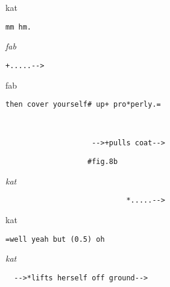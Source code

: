 \documentclass[output=paper,nonflat,modfont,draft]{langsci/langscibook}
\begin{document}

\begin{transbox}{6}{kat}
\begin{verbatim}
mm hm.
\end{verbatim}
\end{transbox}


\begin{transbox}{8}{\textit{fab}}
\begin{verbatim}
+.....-->
\end{verbatim}
\end{transbox}

\begin{mdframedkendrick}[style=firstfoc]
\begin{transbox}{9}{fab}
\begin{verbatim}
then cover yourself# up+ pro*perly.=
\end{verbatim}
\end{transbox}
\end{mdframedkendrick}\vspace{-5mm}

\begin{transbox}{10}{~}
\begin{verbatim}
                    -->+pulls coat-->
\end{verbatim}
\end{transbox}

\begin{transbox}{11}{\fig}
\begin{verbatim}
                   #fig.8b
\end{verbatim}
\end{transbox}

\begin{transbox}{12}{\textit{kat}}
\begin{verbatim}
                            *.....-->
\end{verbatim}
\end{transbox}

\begin{transbox}{13}{kat}
\begin{verbatim}
=well yeah but (0.5) oh
\end{verbatim}
\end{transbox}


\begin{mdframedkendrick}[style=secondfoc]
\begin{transbox}{15}{\textit{kat}}
\begin{verbatim}
  -->*lifts herself off ground-->
\end{verbatim}
\end{transbox}
\end{mdframedkendrick}\vspace{-5mm}
\end{document}
